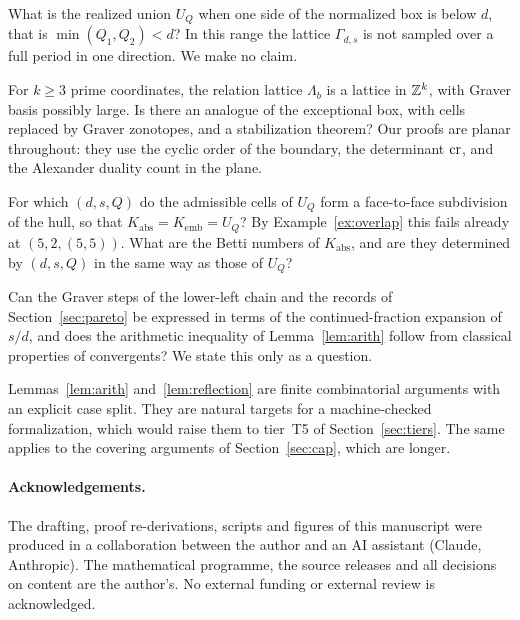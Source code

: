 \begin{question}\label{q:thin}
What is the realized union $U_Q$ when one side of the normalized box is below $d$, that is $\min(Q_1,Q_2)<d$? In this range the lattice $\Gamma_{d,s}$ is not sampled over a full period in one direction. We make no claim.
\end{question}

\begin{question}\label{q:higher}
For $k\ge3$ prime coordinates, the relation lattice $\Lambda_b$ is a lattice in $\mathbb Z^k$, with Graver basis possibly large. Is there an analogue of the exceptional box, with cells replaced by Graver zonotopes, and a stabilization theorem? Our proofs are planar throughout: they use the cyclic order of the boundary, the determinant $\operatorname{cr}$, and the Alexander duality count in the plane.
\end{question}

\begin{question}\label{q:embedded}
For which $(d,s,Q)$ do the admissible cells of $U_Q$ form a face-to-face subdivision of the hull, so that $K_{\mathrm{abs}}=K_{\mathrm{emb}}=U_Q$? By Example~\ref{ex:overlap} this fails already at $(5,2,(5,5))$. What are the Betti numbers of $K_{\mathrm{abs}}$, and are they determined by $(d,s,Q)$ in the same way as those of $U_Q$?
\end{question}

\begin{question}\label{q:cf}
Can the Graver steps of the lower-left chain and the records of Section~\ref{sec:pareto} be expressed in terms of the continued-fraction expansion of $s/d$, and does the arithmetic inequality of Lemma~\ref{lem:arith} follow from classical properties of convergents? We state this only as a question.
\end{question}

\begin{question}\label{q:formal}
Lemmas~\ref{lem:arith} and~\ref{lem:reflection} are finite combinatorial arguments with an explicit case split. They are natural targets for a machine-checked formalization, which would raise them to tier~T5 of Section~\ref{sec:tiers}. The same applies to the covering arguments of Section~\ref{sec:cap}, which are longer.
\end{question}

\paragraph{Acknowledgements.}
The drafting, proof re-derivations, scripts and figures of this manuscript were produced in a collaboration between the author and an AI assistant (Claude, Anthropic). The mathematical programme, the source releases and all decisions on content are the author's. No external funding or external review is acknowledged.
